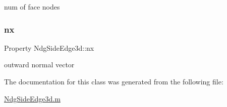 num of face nodes 

\mbox{\label{class_ndg_side_edge3d_a0a1ee5d85e20b36a290d795004d6c3f6}} 
\subsubsection{\texorpdfstring{nx}{nx}}
{\footnotesize\ttfamily Property Ndg\+Side\+Edge3d\+::nx\hspace{0.3cm}{\ttfamily [protected]}}



outward normal vector 



The documentation for this class was generated from the following file\+:\begin{DoxyCompactItemize}
\item 
\hyperlink{_ndg_side_edge3d_8m}{Ndg\+Side\+Edge3d.\+m}\end{DoxyCompactItemize}
